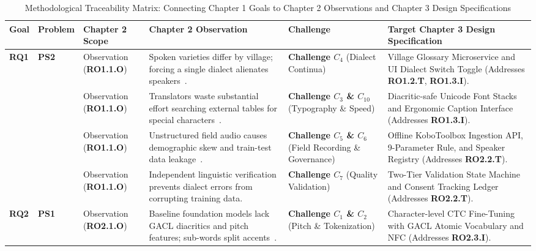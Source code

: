 \documentclass[a4paper,11pt]{article}
\begin{document}
\begin{table}[t]
\centering
\small
\setlength{\tabcolsep}{3.5pt}
\caption{Methodological Traceability Matrix: Connecting Chapter 1 Goals to Chapter 2 Observations and Chapter 3 Design Specifications}
\label{tab:traceability_mapping}
\begin{tabular}{p{1.1cm} p{1.4cm} >{\raggedright\arraybackslash}p{2.2cm} >{\raggedright\arraybackslash}p{4.2cm} >{\raggedright\arraybackslash}p{2.6cm} >{\raggedright\arraybackslash}p{4.0cm}}
\toprule
\textbf{Goal} & \textbf{Problem} & \textbf{Chapter 2 Scope} & \textbf{Chapter 2 Observation} & \textbf{Challenge} & \textbf{Target Chapter 3 Design Specification} \\
\midrule
\multirow{4}{*}{\textbf{RQ1}} & \multirow{4}{*}{\textbf{PS2}} & Observation (\textbf{RO1.1.O}) & Spoken varieties differ by village; forcing a single dialect alienates speakers~\cite{bitjaakody2001basaa, sadembouo1984systematique}. & \textbf{Challenge $C_4$} (Dialect Continua) & Village Glossary Microservice and UI Dialect Switch Toggle (Addresses \textbf{RO1.2.T}, \textbf{RO1.3.I}). \\
\addlinespace
& & Observation (\textbf{RO1.1.O}) & Translators waste substantial effort searching external tables for special characters~\cite{tadadjeu1979alphabet}. & \textbf{Challenge $C_3$ \& $C_{10}$} (Typography \& Speed) & Diacritic-safe Unicode Font Stacks and Ergonomic Caption Interface (Addresses \textbf{RO1.3.I}). \\
\addlinespace
& & Observation (\textbf{RO1.1.O}) & Unstructured field audio causes demographic skew and train-test data leakage~\cite{gauthier2016collecting}. & \textbf{Challenge $C_5$ \& $C_6$} (Field Recording \& Governance) & Offline KoboToolbox Ingestion API, 9-Parameter Rule, and Speaker Registry (Addresses \textbf{RO2.2.T}). \\
\addlinespace
& & Observation (\textbf{RO1.1.O}) & Independent linguistic verification prevents dialect errors from corrupting training data. & \textbf{Challenge $C_7$} (Quality Validation) & Two-Tier Validation State Machine and Consent Tracking Ledger (Addresses \textbf{RO2.2.T}). \\
\midrule
\multirow{4}{*}{\textbf{RQ2}} & \multirow{4}{*}{\textbf{PS1}} & Observation (\textbf{RO2.1.O}) & Baseline foundation models lack GACL diacritics and pitch features; sub-words split accents~\cite{radford2023robust}. & \textbf{Challenge $C_1$ \& $C_2$} (Pitch \& Tokenization) & Character-level CTC Fine-Tuning with GACL Atomic Vocabulary and NFC (Addresses \textbf{RO2.3.I}). \\

\end{tabular}
\end{table}
\end{document}
